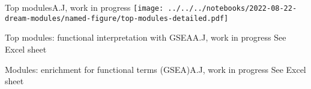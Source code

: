 \documentclass[aspectratio=169]{beamer}
\begin{document}
\begin{frame}{Top modules}{A.J, work in progress}
  \texttt{[image: ../../../notebooks/2022-08-22-dream-modules/named-figure/top-modules-detailed.pdf]}
\end{frame}

\begin{frame}{Top modules: functional interpretation with GSEA}{A.J, work in progress}
  See Excel sheet
\end{frame}


\begin{frame}{Modules: enrichment for functional terms (GSEA)}{A.J, work in progress}
  See Excel sheet
\end{frame}
\end{document}
